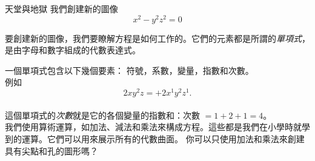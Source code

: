 \begin{surferPage}{天堂與地獄}
我們創建新的圖像\\
\smallskip
\[x^2	- y^2z^2	= 0\]

\singlespacing
要創建新的圖像，我們要瞭解方程是如何工作的。它們的元素都是所謂的\textit{單項式}，是由字母和數字組成的代數表達式。

\singlespacing
一個單項式包含以下幾個要素：
符號，系數，變量，指數和次數。\\

\singlespacing
例如
\smallskip
\[2xy^2z = +2x^1y^2z^1.\]
\\
\smallskip
這個單項式的\textit{次數}就是它的各個變量的指數和：次數 $ = 1+2+1=4$。\\

\singlespacing
我們使用算術運算，如加法、減法和乘法來構成方程。這些都是我們在小學時就學到的運算。它們可以用來展示所有的代數曲面。
\singlespacing
你可以只使用加法和乘法來創建具有尖點和孔的圖形嗎？
\end{surferPage}

